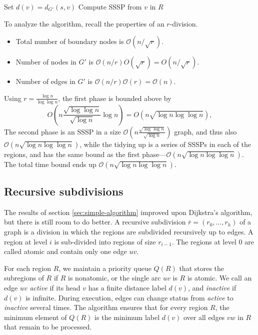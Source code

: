 \documentclass[11pt]{article}
\begin{document}
\begin{algorithm}[!htb]
  \label{alg:sssp-full}
  \begin{algorithmic}
        \State Set $d(v) = d_{G'}(s,v)$
        \State Compute SSSP from $v$ in $R$
      \EndFor
    \EndFor
  \end{algorithmic}
\end{algorithm}

To analyze the algorithm, recall the properties of an $r$-division.
\begin{itemize}
\item Total number of boundary nodes is $\mathcal{O}(n/\sqrt{r})$.
\item Number of nodes in $G'$ is $\mathcal{O}(n/r)O(\sqrt{r})=O(n/\sqrt{r})$.
\item Number of edges in $G'$ is $\mathcal{O}(n/r)\mathcal{O}(r) = \mathcal{O}(n)$.
\end{itemize}

Using $r=\frac{\log n}{\log \log n}$, the first phase is bounded above by
\[
  O\left(n\frac{\sqrt{\log \log n}}{\sqrt{\log n}} \log n\right)= O(n \sqrt{\log n \log \log n}),
\]
The second phase is an SSSP in a size $\mathcal{O}(n \frac{\sqrt{\log \log n}}{\sqrt{\log n}})$ graph, and thus also $\mathcal{O}(n \sqrt{\log n \log \log n})$, while the tidying up is a series of SSSPs in each of the regions, and has the same bound as the first phase---$\mathcal{O}(n \sqrt{\log n \log \log n})$. The total time bound ends up $\mathcal{O}(n \sqrt{\log n \log \log n})$.

\subsection{Recursive subdivisions}
\label{sec:recursion}

The results of section \ref{sec:simple-algorithm} improved upon Dijkstra's algorithm, but there is still room to do better. A recursive subdivision $\bar{r} = (r_0, \ldots, r_h)$ of a graph is a division in which the regions are subdivided recursively up to edges. A region at level $i$ is sub-divided into regions of size $r_{i-1}$. The regions at level $0$ are called atomic and contain only one edge $uv$.

For each region $R$, we maintain a priority queue $Q(R)$ that stores the subregions of $R$ if $R$ is nonatomic, or the single arc $uv$ is $R$ is atomic. We call an edge $uv$ \emph{active} if its head $v$ has a finite distance label $d(v)$, and \emph{inactive} if $d(v)$ is infinite. During execution, edges can change status from \emph{active} to \emph{inactive} several times. The algorithm ensures that for every region $R$, the minimum element of $Q(R)$ is the minimum label $d(v)$ over all edges $vw$ in $R$ that remain to be processed.
\end{document}

